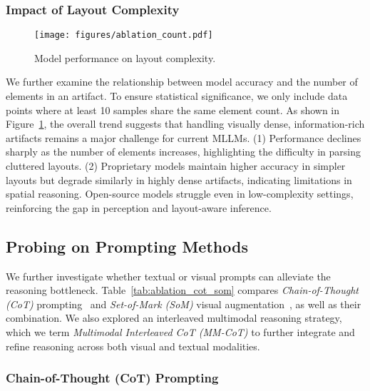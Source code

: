\subsubsection{Impact of Layout Complexity}

\begin{figure}[t]
\setlength\tabcolsep{0pt}
\setlength{\abovecaptionskip}{0.1cm}
    \centering
    \texttt{[image: figures/ablation\_count.pdf]}
    \caption{Model performance on layout complexity.}
    \label{fig:ablation_count}
\end{figure}

We further examine the relationship between model accuracy and the number of elements in an artifact. To ensure statistical significance, we only include data points where at least 10 samples share the same element count. As shown in Figure~\ref{fig:ablation_count}, the overall trend suggests that handling visually dense, information-rich artifacts remains a major challenge for current MLLMs.
(1) Performance declines sharply as the number of elements increases, highlighting the difficulty in parsing cluttered layouts.
(2) Proprietary models maintain higher accuracy in simpler layouts but degrade similarly in highly dense artifacts, indicating limitations in spatial reasoning. Open-source models struggle even in low-complexity settings, reinforcing the gap in perception and layout-aware inference.

\subsection{Probing on Prompting Methods}



We further investigate whether textual or visual prompts can alleviate the reasoning bottleneck. Table~\ref{tab:ablation_cot_som} compares \emph{Chain-of-Thought (CoT)} prompting~\cite{chain-of-thought} and \emph{Set-of-Mark (SoM)} visual augmentation~\cite{Yang2023SetofMarkPU}, as well as their combination. We also explored an interleaved multimodal reasoning strategy, which we term \emph{Multimodal Interleaved CoT (MM-CoT)} to further integrate and refine reasoning across both visual and textual modalities.

\subsubsection{Chain-of-Thought (CoT) Prompting}

